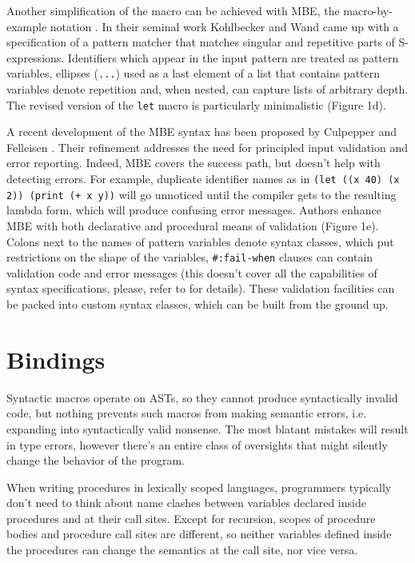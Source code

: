 \documentclass[10pt,journal,a4paper]{IEEEtran}
\begin{document}
Another simplification of the macro can be achieved with MBE, the macro-by-example notation
\cite{kohlbecker87}. In their seminal work Kohlbecker and Wand came up with a specification
of a pattern matcher that matches singular and repetitive parts of S-expressions.
Identifiers which appear in the input pattern are treated as pattern variables,
ellipses (\texttt{...}) used as a last element of a list that contains pattern variables
denote repetition and, when nested, can capture lists of arbitrary depth.
The revised version of the \small \texttt{let} \normalsize macro is particularly minimalistic (Figure 1d).

A recent development of the MBE syntax has been proposed by Culpepper and Felleisen \cite{culpepper10}.
Their refinement addresses the need for principled input validation and error reporting. Indeed,
MBE covers the success path, but doesn't help with detecting errors. For example,
duplicate identifier names as in \small \texttt{(let ((x 40) (x 2)) (print (+ x y))} \normalsize will go
unnoticed until the compiler gets to the resulting lambda form, which will produce
confusing error messages. Authors enhance MBE with both declarative and procedural
means of validation (Figure 1e). Colons next to the names of pattern variables denote syntax classes,
which put restrictions on the shape of the variables, \small \texttt{\#:fail-when} \normalsize
clauses can contain validation code and error messages (this doesn't cover all the capabilities
of syntax specifications, please, refer to \cite{culpepper10} for details).
These validation facilities can be packed into custom syntax classes, which can be built from the ground up.

\section{Bindings}

Syntactic macros operate on ASTs, so they cannot produce syntactically invalid code,
but nothing prevents such macros from making semantic errors, i.e. expanding into
syntactically valid nonsense.
The most blatant mistakes will result in type errors, however there's an entire class
of oversights that might silently change the behavior of the program.

When writing procedures in lexically scoped languages, programmers typically don't need to think
about name clashes between variables declared inside procedures and at their call sites.
Except for recursion, scopes of procedure bodies and procedure call sites are different, so
neither variables defined inside the procedures can change the semantics at the call site, nor vice versa.
\end{document}
